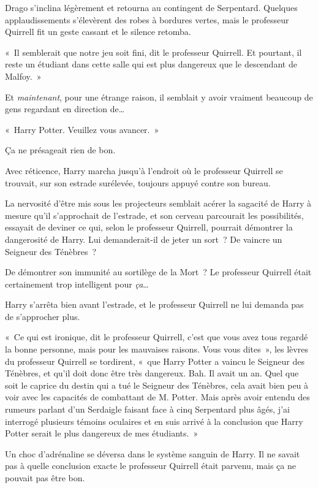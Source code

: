 Drago s'inclina légèrement et retourna au contingent de Serpentard. Quelques applaudissements s'élevèrent des robes à bordures vertes, mais le professeur Quirrell fit un geste cassant et le silence retomba.

«~Il semblerait que notre jeu soit fini, dit le professeur Quirrell. Et pourtant, il reste un étudiant dans cette salle qui est plus dangereux que le descendant de Malfoy.~»

Et \emph{maintenant}, pour une étrange raison, il semblait y avoir vraiment beaucoup de gens regardant en direction de…

«~Harry Potter. Veuillez vous avancer.~»

Ça ne présageait rien de bon.

Avec réticence, Harry marcha jusqu'à l'endroit où le professeur Quirrell se trouvait, sur son estrade surélevée, toujours appuyé contre son bureau.

La nervosité d'être mis sous les projecteurs semblait acérer la sagacité de Harry à mesure qu'il s'approchait de l'estrade, et son cerveau parcourait les possibilités, essayait de deviner ce qui, selon le professeur Quirrell, pourrait démontrer la dangerosité de Harry. Lui demanderait-il de jeter un sort~? De vaincre un Seigneur des Ténèbres~?

De démontrer son immunité au sortilège de la Mort~? Le professeur Quirrell était certainement trop intelligent pour \emph{ça}…

Harry s'arrêta bien avant l'estrade, et le professeur Quirrell ne lui demanda pas de s'approcher plus.

«~Ce qui est ironique, dit le professeur Quirrell, c'est que vous avez tous regardé la bonne personne, mais pour les mauvaises raisons. Vous vous dites~», les lèvres du professeur Quirrell se tordirent, «~que Harry Potter a vaincu le Seigneur des Ténèbres, et qu'il doit donc être très dangereux. Bah. Il avait un an. Quel que soit le caprice du destin qui a tué le Seigneur des Ténèbres, cela avait bien peu à voir avec les capacités de combattant de M. Potter. Mais après avoir entendu des rumeurs parlant d'un Serdaigle faisant face à cinq Serpentard plus âgés, j'ai interrogé plusieurs témoins oculaires et en suis arrivé à la conclusion que Harry Potter serait le plus dangereux de mes étudiants.~»

Un choc d'adrénaline se déversa dans le système sanguin de Harry. Il ne savait pas à quelle conclusion exacte le professeur Quirrell était parvenu, mais ça ne pouvait pas être bon.

